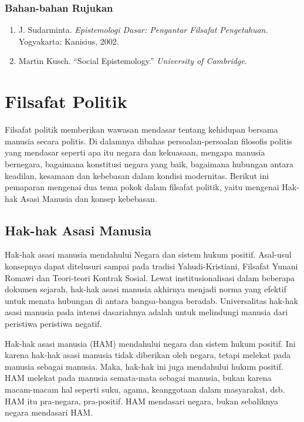 \documentclass[10pt,a4paper]{article}
\renewenvironment{quote}
{\list{}{%
       \leftmargin 1.5em 
       \rightmargin 0em}
   \item\relax}
{\endlist}
\def\tightlist{}
\begin{document}
\begin{multicols}{2}
\hypertarget{bahan-bahan-rujukan-1}{%
\subsubsection{Bahan-bahan Rujukan}\label{bahan-bahan-rujukan-1}}

\begin{enumerate}
\def\labelenumi{\arabic{enumi}.}
\tightlist
\item
  J. Sudarminta. \emph{Epistemologi Dasar: Pengantar Filsafat
  Pengetahuan.} Yogyakarta: Kanisius, 2002.
\item
  Martin Kusch. ``Social Epistemology.'' \emph{University of Cambridge}.
\end{enumerate}

\hypertarget{filsafat-politik}{%
\section{Filsafat Politik}\label{filsafat-politik}}

Filsafat politik memberikan wawasan mendasar tentang kehidupan bersama
manusia secara politis. Di dalamnya dibahas persoalan-persoalan
filosofis politis yang mendasar seperti apa itu negara dan kekuasaan,
mengapa manusia bernegara, bagaimana konstitusi negara yang baik,
bagaimana hubungan antara keadilan, kesamaan dan kebebasan dalam kondisi
modernitas. Berikut ini pemaparan mengenai dua tema pokok dalam filsafat
politik, yaitu mengenai Hak-hak Asasi Manusia dan konsep kebebasan.

\hypertarget{hak-hak-asasi-manusia}{%
\subsection{Hak-hak Asasi Manusia}\label{hak-hak-asasi-manusia}}

\begin{quote}
Hak-hak asasi manusia mendahului Negara dan sistem hukum positif.
Asal-usul konsepnya dapat ditelusuri sampai pada tradisi
Yahudi-Kristiani, Filsafat Yunani Romawi dan Teori-teori Kontrak Sosial.
Lewat institusionalisasi dalam beberapa dokumen sejarah, hak-hak asasi
manusia akhirnya menjadi norma yang efektif untuk menata hubungan di
antara bangsa-bangsa beradab. Universalitas hak-hak asasi manusia pada
intensi dasariahnya adalah untuk melindungi manusia dari peristiwa
peristiwa negatif.
\end{quote}

Hak-hak asasi manusia (HAM) mendahului negara dan sistem hukum positif.
Ini karena hak-hak asasi manusia tidak diberikan oleh negara, tetapi
melekat pada manusia sebagai manusia. Maka, hak-hak ini juga mendahului
hukum positif. HAM melekat pada manusia semata-mata sebagai manusia,
bukan karena macam-macam hal seperti suku, agama, keanggotaan dalam
masyarakat, dsb. HAM itu pra-negara, pra-positif. HAM mendasari negara,
bukan sebaliknya negara mendasari HAM.


\end{multicols}
\end{document}
